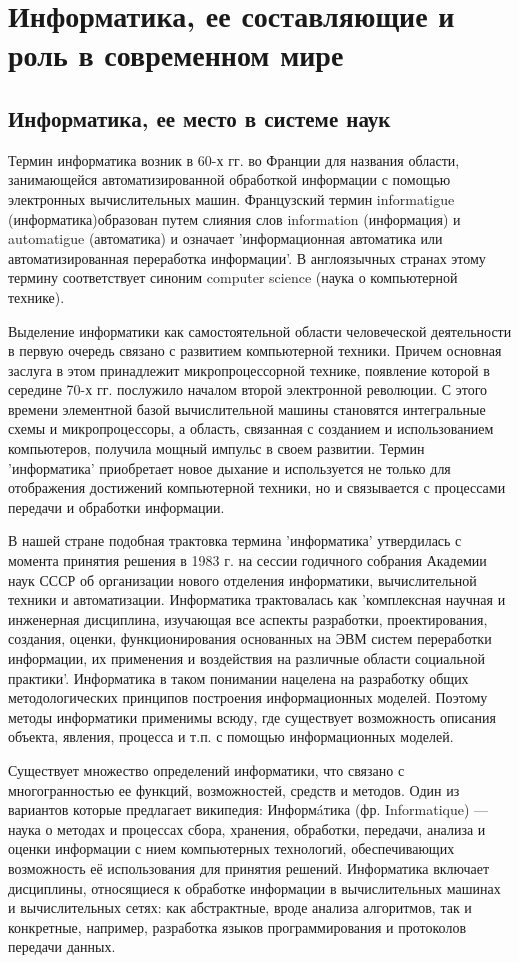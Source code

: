 \documentclass[a4paper]{article}
\begin{document}
\section{Информатика, ее составляющие и роль в современном мире}

\subsection{Информатика, ее место в системе наук}

Термин информатика возник в 60-х гг. во Франции для названия области, занимающейся автоматизированной обработкой информации с помощью электронных вычислительных машин. Французский термин informatigue (информатика)образован путем слияния слов information (информация) и automatigue (автоматика) и означает 'информационная автоматика или автоматизированная переработка информации'. В англоязычных странах этому термину соответствует синоним computer science (наука о компьютерной технике).

Выделение информатики как самостоятельной области человеческой деятельности в первую очередь связано с развитием компьютерной техники. Причем основная заслуга в этом принадлежит микропроцессорной технике, появление которой в середине 70-х гг. послужило началом второй электронной революции. С этого времени элементной базой вычислительной машины становятся интегральные схемы и микропроцессоры, а область, связанная с созданием и использованием компьютеров, получила мощный импульс в своем развитии. Термин 'информатика' приобретает новое дыхание и используется не только для отображения достижений компьютерной техники, но и связывается с процессами передачи и обработки информации.

В нашей стране подобная трактовка термина 'информатика' утвердилась с момента принятия решения в 1983 г. на сессии годичного собрания Академии наук СССР об организации нового отделения информатики, вычислительной техники и автоматизации. Информатика трактовалась как 'комплексная научная и инженерная дисциплина, изучающая все аспекты разработки, проектирования, создания, оценки, функционирования основанных на ЭВМ систем переработки информации, их применения и воздействия на различные области социальной практики'. Информатика в таком понимании нацелена на разработку общих методологических принципов построения информационных моделей. Поэтому методы информатики применимы всюду, где существует возможность описания объекта, явления, процесса и т.п. с помощью информационных моделей.

Существует множество определений информатики, что связано с многогранностью ее функций, возможностей, средств и методов. Один из вариантов которые предлагает википедия: Информáтика (фр. Informatique) — наука о методах и процессах сбора, хранения, обработки, передачи, анализа и оценки информации с нием компьютерных технологий, обеспечивающих возможность её использования для принятия решений. Информатика включает дисциплины, относящиеся к обработке информации в вычислительных машинах и вычислительных сетях: как абстрактные, вроде анализа алгоритмов, так и конкретные, например, разработка языков программирования и протоколов передачи данных.
\end{document}

